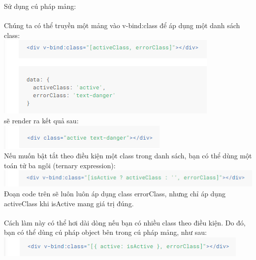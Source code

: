 \documentclass[12pt,a4paper]{report}
\begin{document}
Sử dụng cú pháp mảng:\\\\Chúng ta có thể truyền một mảng vào v-bind:class để áp dụng một danh sách class:\\\includegraphics[scale=1]{27}\\ sẽ render ra kết quả sau:\\\includegraphics[scale=1]{28}\\Nếu muốn bật tắt theo điều kiện một class trong danh sách, bạn có thể dùng một toán tử ba ngôi (ternary expression):\\\includegraphics[scale=1]{29}\\Đoạn code trên sẽ luôn luôn áp dụng class errorClass, nhưng chỉ áp dụng activeClass khi isActive mang giá trị đúng.\\\\Cách làm này có thể hơi dài dòng nếu bạn có nhiều class theo điều kiện. Do đó, bạn có thể dùng cú pháp object bên trong cú pháp mảng, như sau:\\\includegraphics[scale=1]{30}
\end{document}
